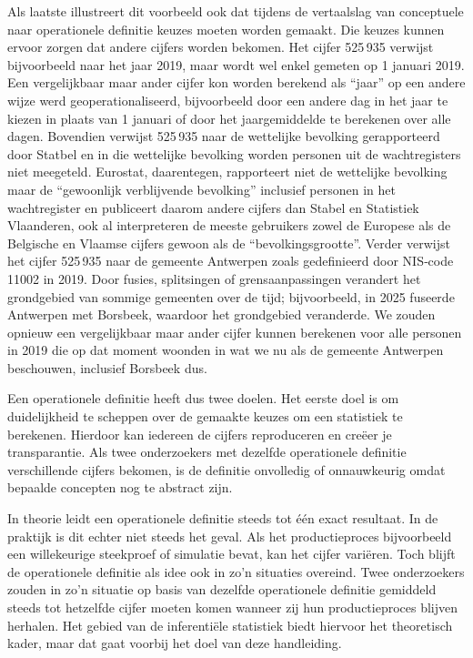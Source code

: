 \documentclass[\mainfiledir/00_handleiding_statistiekproductie.tex]{subfiles}
\begin{document}
Als laatste illustreert dit voorbeeld ook dat tijdens de vertaalslag van conceptuele naar operationele definitie keuzes moeten worden gemaakt. Die keuzes kunnen ervoor zorgen dat andere cijfers worden bekomen. Het cijfer 525\,935 verwijst bijvoorbeeld naar het jaar 2019, maar wordt wel enkel gemeten op 1 januari 2019. Een vergelijkbaar maar ander cijfer kon worden berekend als ``jaar'' op een andere wijze werd geoperationaliseerd, bijvoorbeeld door een andere dag in het jaar te kiezen in plaats van 1 januari of door het jaargemiddelde te berekenen over alle dagen. Bovendien verwijst 525\,935 naar de wettelijke bevolking gerapporteerd door Statbel en in die wettelijke bevolking worden personen uit de wachtregisters niet meegeteld. Eurostat, daarentegen, rapporteert niet de wettelijke bevolking maar de ``gewoonlijk verblijvende bevolking'' inclusief personen in het wachtregister en publiceert daarom andere cijfers dan Stabel en Statistiek Vlaanderen, ook al interpreteren de meeste gebruikers zowel de Europese als de Belgische en Vlaamse cijfers gewoon als de ``bevolkingsgrootte''. Verder verwijst het cijfer 525\,935 naar de gemeente Antwerpen zoals gedefinieerd door NIS‐code 11002 in 2019. Door fusies, splitsingen of grensaanpassingen verandert het grondgebied van sommige gemeenten over de tijd; bijvoorbeeld, in 2025 fuseerde Antwerpen met Borsbeek, waardoor het grondgebied veranderde. We zouden opnieuw een vergelijkbaar maar ander cijfer kunnen berekenen voor alle personen in 2019 die op dat moment woonden in wat we nu als de gemeente Antwerpen beschouwen, inclusief Borsbeek dus. 

Een operationele definitie heeft dus twee doelen. Het eerste doel is om duidelijkheid te scheppen over de gemaakte keuzes om een statistiek te berekenen. Hierdoor kan iedereen de cijfers reproduceren en creëer je transparantie. Als twee onderzoekers met dezelfde operationele definitie verschillende cijfers bekomen, is de definitie onvolledig of onnauwkeurig omdat bepaalde concepten nog te abstract zijn. 

\begin{info} 
	In theorie leidt een operationele definitie steeds tot één exact resultaat. In de praktijk is dit echter niet steeds het geval. Als het productieproces bijvoorbeeld een willekeurige steekproef of simulatie bevat, kan het cijfer variëren. Toch blijft de operationele definitie als idee ook in zo'n situaties overeind. Twee onderzoekers zouden in zo'n situatie op basis van dezelfde operationele definitie gemiddeld steeds tot hetzelfde cijfer moeten komen wanneer zij hun productieproces blijven herhalen. Het gebied van de inferentiële statistiek biedt hiervoor het theoretisch kader, maar dat gaat voorbij het doel van deze handleiding.
\end{info}
	
\end{document}

